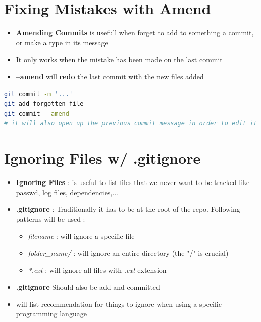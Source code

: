 \documentclass{report}
\begin{document}
\section{Fixing Mistakes with Amend}

\begin{itemize}
	\item \textbf{Amending Commits} is usefull when forget to add to something a commit, or make a type in its message 
	\item It only works when the mistake has been made on the last commit 
	\item \textbf{--amend} will \textbf{redo} the last commit with the new files added  
\end{itemize}

\begin{tcolorbox}[title=Amending Commits,colback=backcolour]
\begin{lstlisting}[language=bash]
git commit -m '...'
git add forgotten_file
git commit --amend
# it will also open up the previous commit message in order to edit it
\end{lstlisting}
\end{tcolorbox}


\section{Ignoring Files w/ .gitignore}

\begin{itemize}
	\item \textbf{Ignoring Files} : is useful to list files that we never want to be tracked like passwd, log files, dependencies,... 
	\item \textbf{.gitignore} : Traditionally it has to be at the root of the repo. Following patterns will be used :
		\begin{itemize}
			\item \textit{filename} : will ignore a specific file 
			\item \textit{folder\_name/ } : will ignore an entire directory (the "/" is crucial)
			\item \textit{*.ext} : will ignore all files with \textit{.ext} extension
		\end{itemize}
	\item \textbf{.gitignore} Should also be add and committed 
	\item {} will list recommendation for things to ignore when using a specific programming language
\end{itemize}
\end{document}
